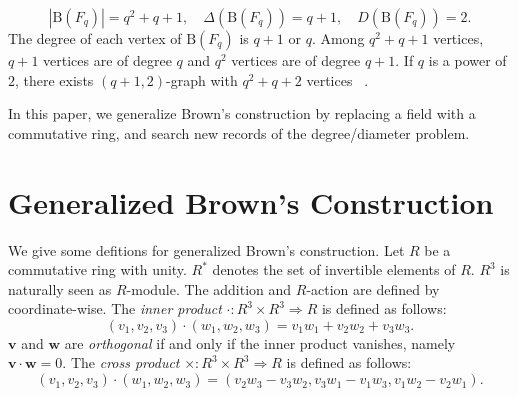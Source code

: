 \documentclass{article}
\newcommand{\Z}{\mathbb Z}
\newcommand{\N}{\mathbb N}
\newcommand{\B}{\mathrm{B}}
\begin{document}
\[|\B(F_q)| = q^2+q+1, \quad
\Delta(\B(F_q)) = q+1, \quad
D(\B(F_q))=2.
\]
The degree of each vertex of $\B(F_q)$ is $q+1$ or $q$. 
Among $q^2+q+1$ vertices, $q+1$ vertices are of degree $q$ and $q^2$ vertices are of degree $q+1$.
If $q$ is a power of $2$, there exists $(q+1,2)$-graph with $q^2+q+2$ vertices ~\cite{journals/networks/ErdosFH80}.

In this paper, we generalize Brown's construction by replacing a field with a commutative ring, and search new records of the degree/diameter problem.

\iffalse

The {\it tensor product} of two graphs $G_1=(V_1,E_1),G_2=(V_2,E_2)$ is a graph $G_1 \otimes G_2$ such that the vertex set is a cartesian product of $V_1$ and $V_2$ and two vertices $(v_1,v_2) \sim (w_1,w_2)$ if and only if $v_1 \sim v_2$ and $w_1 \sim w_2$. If $G_1, G_2$ are regular, the tensor product $G_1 \times G_2$ is also regular. 

\fi

\section{Generalized Brown's Construction}
We give some defitions for generalized Brown's construction.
Let $R$ be a commutative ring with unity. 
$R^*$ denotes the set of invertible elements of $R$.
$R^3$ is naturally seen as $R$-module. 
The addition and $R$-action are defined by coordinate-wise.
The {\it inner product} $\cdot: R^3 \times R^3 \Rightarrow R$ is defined as follows:
\[ (v_1,v_2,v_3) \cdot (w_1,w_2,w_3) = v_1 w_1 + v_2 w_2 + v_3 w_3 .\]
${\bm v}$ and ${\bm w}$ are {\it orthogonal} if and only if the inner product vanishes, namely ${\bm v} \cdot {\bm w} = 0$.
The {\it cross product} $\times: R^3 \times R^3 \Rightarrow R$ is defined as follows:
\[ (v_1,v_2,v_3) \cdot (w_1,w_2,w_3) = ( v_2 w_3 - v_3 w_2, v_3 w_1 - v_1 w_3, v_1 w_2 - v_2 w_1 ). \]
\iffalse
A {\it domain} $D$ is a commutative ring without zero divisors.
A {\it Euclidean domain} is a domain $E$ with a function called degree $d: E \setminus \{0\} \Rightarrow \N$ such that for all non-zero $a,b$ in $E$ there exists $q,r \in E, a = q b + r$ where $d(r) < d(b)$. Every {\it Euclidean domain} is a {\it unique factorization domain}, in which for all $r$ in $E$, there exist prime elements $u_i$ and natural numbers $k_i$ such that $r = \Pi_i u_i^{k_i}$.
The ring of integers $\Z$ is a example of the Euclidean domain whose degree function is an identity function.
\fi
\end{document}
